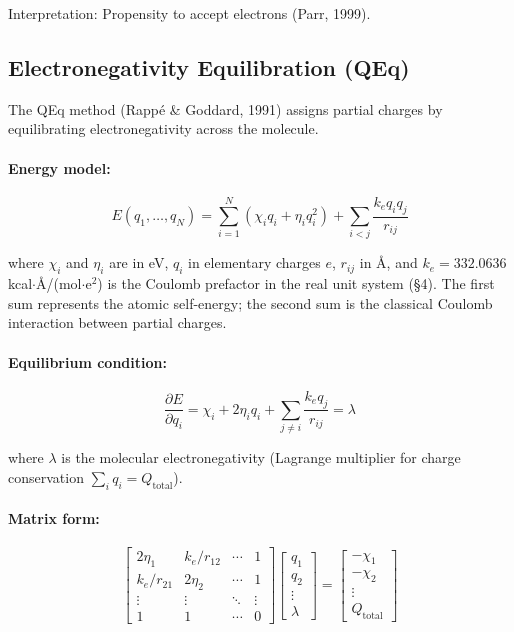 \documentclass[11pt]{article}
\begin{document}
Interpretation: Propensity to accept electrons (Parr, 1999).

\subsection{Electronegativity Equilibration (QEq)}

The QEq method (Rappé \& Goddard, 1991) assigns partial charges by equilibrating electronegativity across the molecule.

\paragraph{Energy model:}
\begin{equation}
E(q_1, \ldots, q_N) = \sum_{i=1}^{N} \left(\chi_i q_i + \eta_i q_i^2\right) + \sum_{i<j} \frac{k_e q_i q_j}{r_{ij}}
\end{equation}

where $\chi_i$ and $\eta_i$ are in eV, $q_i$ in elementary charges $e$, $r_{ij}$ in \AA, and $k_e = 332.0636$ kcal$\cdot$\AA/(mol$\cdot$e$^2$) is the Coulomb prefactor in the real unit system (\S4). The first sum represents the atomic self-energy; the second sum is the classical Coulomb interaction between partial charges.

\paragraph{Equilibrium condition:}
\begin{equation}
\frac{\partial E}{\partial q_i} = \chi_i + 2\eta_i q_i + \sum_{j \neq i} \frac{k_e q_j}{r_{ij}} = \lambda
\end{equation}

where $\lambda$ is the molecular electronegativity (Lagrange multiplier for charge conservation $\sum_i q_i = Q_{\text{total}}$).

\paragraph{Matrix form:}
\begin{equation}
\begin{bmatrix}
2\eta_1 & k_e/r_{12} & \cdots & 1 \\
k_e/r_{21} & 2\eta_2 & \cdots & 1 \\
\vdots & \vdots & \ddots & \vdots \\
1 & 1 & \cdots & 0
\end{bmatrix}
\begin{bmatrix}
q_1 \\ q_2 \\ \vdots \\ \lambda
\end{bmatrix}
=
\begin{bmatrix}
-\chi_1 \\ -\chi_2 \\ \vdots \\ Q_{\text{total}}
\end{bmatrix}
\end{equation}
\end{document}
